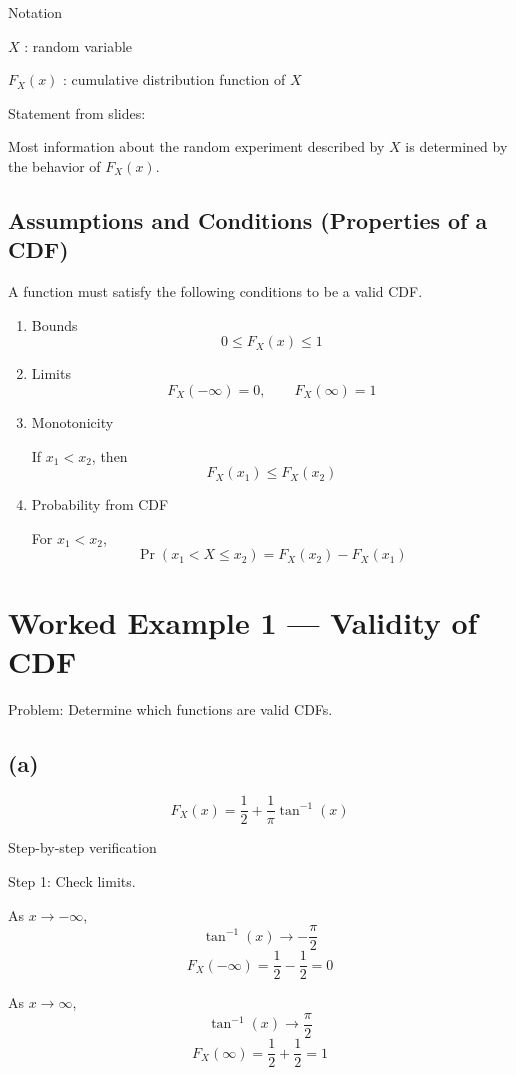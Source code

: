 \documentclass[12pt]{article}
\begin{document}
Notation

$X$ : random variable

$F_X(x)$ : cumulative distribution function of $X$

Statement from slides:

Most information about the random experiment described by $X$ is determined by the behavior of $F_X(x)$.

\subsection{Assumptions and Conditions (Properties of a CDF)}

A function must satisfy the following conditions to be a valid CDF.

\begin{enumerate}
\item Bounds
\[
0 \le F_X(x) \le 1
\]

\item Limits
\[
F_X(-\infty) = 0, \qquad F_X(\infty) = 1
\]

\item Monotonicity

If $x_1 < x_2$, then
\[
F_X(x_1) \le F_X(x_2)
\]

\item Probability from CDF

For $x_1 < x_2$,
\[
\Pr(x_1 < X \le x_2) = F_X(x_2) - F_X(x_1)
\]
\end{enumerate}

\section{Worked Example 1 --- Validity of CDF}

Problem: Determine which functions are valid CDFs.

\subsection*{(a)}

\[
F_X(x) = \frac{1}{2} + \frac{1}{\pi}\tan^{-1}(x)
\]

Step-by-step verification

Step 1: Check limits.

As $x \to -\infty$,
\[
\tan^{-1}(x) \to -\frac{\pi}{2}
\]
\[
F_X(-\infty) = \frac{1}{2} - \frac{1}{2} = 0
\]

As $x \to \infty$,
\[
\tan^{-1}(x) \to \frac{\pi}{2}
\]
\[
F_X(\infty) = \frac{1}{2} + \frac{1}{2} = 1
\]
\end{document}

